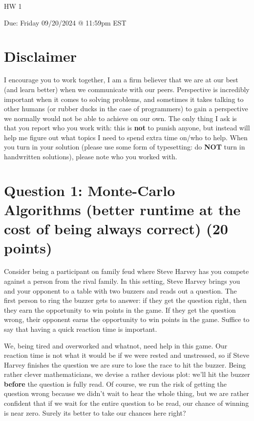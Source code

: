 \documentclass[11pt]{article}
\newcommand{\question}[1]{\section*{\normalsize #1}}
\begin{document}
\begin{center}
    {\Large \textsc{HW 1}}
\end{center}
\begin{center}
    Due: Friday 09/20/2024 @ 11:59pm EST
\end{center}

\section*{\textbf{Disclaimer}}
I encourage you to work together, I am a firm believer that we are at our best (and learn better) when we communicate with our peers. Perspective is incredibly important when it comes to solving problems, and sometimes it takes talking to other humans (or rubber ducks in the case of programmers) to gain a perspective we normally would not be able to achieve on our own. The only thing I ask is that you report who you work with: this is \textbf{not} to punish anyone, but instead will help me figure out what topics I need to spend extra time on/who to help. When you turn in your solution (please use some form of typesetting: do \textbf{NOT} turn in handwritten solutions), please note who you worked with.



\question{Question 1: Monte-Carlo Algorithms (better runtime at the cost of being always correct) (20 points)}
Consider being a participant on family feud where Steve Harvey has you compete against a person from the rival family. In this setting, Steve Harvey brings you and your opponent to a table with two buzzers and reads out a question. The first person to ring the buzzer gets to answer: if they get the question right, then they earn the opportunity to win points in the game. If they get the question wrong, their opponent earns the opportunity to win points in the game. Suffice to say that having a quick reaction time is important.\newline

\noindent We, being tired and overworked and whatnot, need help in this game. Our reaction time is not what it would be if we were rested and unstressed, so if Steve Harvey finishes the question we are sure to lose the race to hit the buzzer. Being rather clever mathematicians, we devise a rather devious plot: we'll hit the buzzer \textbf{before} the question is fully read. Of course, we run the risk of getting the question wrong because we didn't wait to hear the whole thing, but we are rather confident that if we wait for the entire question to be read, our chance of winning is near zero. Surely its better to take our chances here right?\newline
\end{document}

